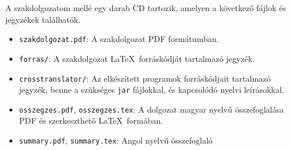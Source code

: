
A szakdolgozatom mellé egy darab CD tartozik, amelyen a következő fájlok és jegyzékek találhatók.

\begin{itemize}
\item \texttt{szakdolgozat.pdf}: A szakdolgozat PDF formátumban.
\item \texttt{forras/}: A szakdolgozat \LaTeX\ forráskódját tartalmazó jegyzék. 
\item \texttt{crosstranslator/}: Az elkészített programok forráskódjait tartalmazó jegyzék, benne a szükséges \texttt{jar} fájlokkal, és kapcsolódó nyelvi leírásokkal.
\item \texttt{osszegzes.pdf}, \texttt{osszegzes.tex}: A dolgozat magyar nyelvű összefoglalása PDF és szerkeszthető \LaTeX\ formában.
\item \texttt{summary.pdf}, \texttt{summary.tex}: Angol nyelvű összefoglaló
\end{itemize}
